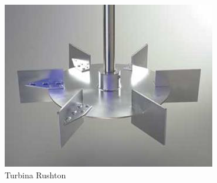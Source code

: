 \begin{multicols}{2}
                \begin{figure}
                    \centering
                    \includegraphics[width=\textwidth]{img/fotos/turbina_rushton.png}
                    \caption{Turbina Rushton}
                    \label{fig:turbina_rushton}
                \end{figure}
            \end{multicols}
            \newpage
            
            
